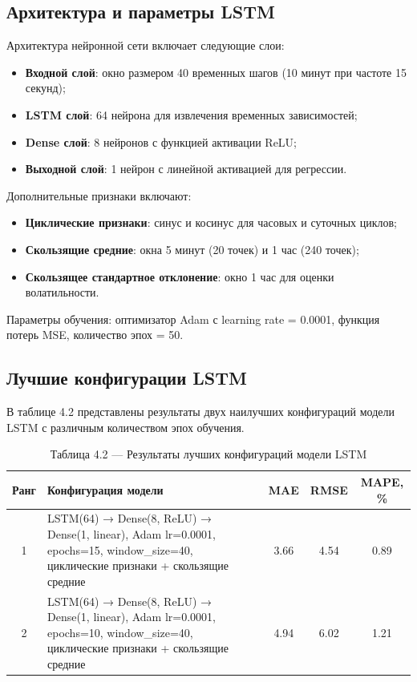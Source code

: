 \subsection{Архитектура и параметры LSTM}

\hspace*{1.25cm}Архитектура нейронной сети включает следующие слои:
\begin{itemize}
	\item \textbf{Входной слой}: окно размером 40 временных шагов (10 минут при частоте 15 секунд);
	\item \textbf{LSTM слой}: 64 нейрона для извлечения временных зависимостей;
	\item \textbf{Dense слой}: 8 нейронов с функцией активации ReLU;
	\item \textbf{Выходной слой}: 1 нейрон с линейной активацией для регрессии.
\end{itemize}

\hspace*{1.25cm}Дополнительные признаки включают:
\begin{itemize}
	\item \textbf{Циклические признаки}: синус и косинус для часовых и суточных циклов;
	\item \textbf{Скользящие средние}: окна 5 минут (20 точек) и 1 час (240 точек);
	\item \textbf{Скользящее стандартное отклонение}: окно 1 час для оценки волатильности.
\end{itemize}

\hspace*{1.25cm}Параметры обучения: оптимизатор Adam с learning rate = 0.0001, функция потерь MSE, количество эпох = 50.

\subsection{Лучшие конфигурации LSTM}

\hspace*{1.25cm}В таблице 4.2 представлены результаты двух наилучших конфигураций модели LSTM с различным количеством эпох обучения.

\begin{table}[H]
	\centering
	\caption*{Таблица 4.2 --- Результаты лучших конфигураций модели LSTM}
	\begin{tabular}{|c|p{8cm}|c|c|c|}
		\hline
		\textbf{Ранг} & \textbf{Конфигурация модели} & \textbf{MAE} & \textbf{RMSE} & \textbf{MAPE, \%} \\
		\hline
		1 & LSTM(64) → Dense(8, ReLU) → Dense(1, linear), Adam lr=0.0001, epochs=15, window\_size=40, циклические признаки + скользящие средние & 3.66 & 4.54 & 0.89 \\
		\hline
		2 & LSTM(64) → Dense(8, ReLU) → Dense(1, linear), Adam lr=0.0001, epochs=10, window\_size=40, циклические признаки + скользящие средние & 4.94 & 6.02 & 1.21 \\
		\hline
	\end{tabular}
	\label{tab:lstm_results}
\end{table}

